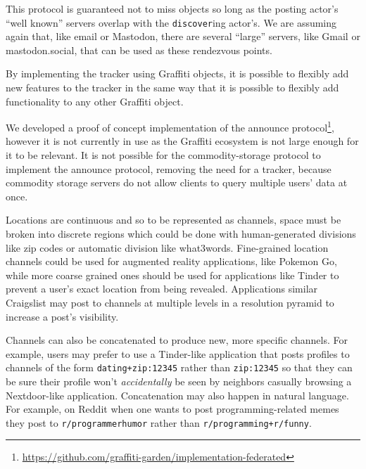 This protocol is guaranteed not to miss objects so long as
the posting actor's ``well known'' servers overlap with the
\texttt{discover}ing actor's.
We are assuming again that, like email or Mastodon, there are several
``large'' servers, like Gmail or mastodon.social, that can be used as these
rendezvous points.

By implementing the tracker using Graffiti objects,
it is possible to flexibly add new features to the tracker
in the same way that it is possible to flexibly add
functionality to any other Graffiti object.

We developed a proof of concept implementation of the announce protocol\footnote{
    \url{https://github.com/graffiti-garden/implementation-federated}
},
however it is not currently in use as the Graffiti ecosystem is not
large enough for it to be relevant.
It is not possible for the commodity-storage protocol to implement
the announce protocol, removing the need for a tracker,
because commodity storage servers do not allow clients to
query multiple users' data at once.


Locations are continuous and so to be represented as channels,
space must be broken into discrete regions which could be done with
human-generated divisions like zip codes or automatic division like
what3words. Fine-grained location channels could be used for
augmented reality applications, like Pokemon Go,
while more coarse grained ones should be used for applications like Tinder
to prevent a user's exact location from being revealed.
Applications similar Craigslist may post to channels at multiple levels in
a resolution pyramid to increase a post's visibility.

Channels can also be concatenated to produce new, more specific channels.
For example, users may prefer to use a Tinder-like application that posts
profiles to channels of the form \texttt{dating+zip:12345} rather than
\texttt{zip:12345} so that they can be sure their profile won't
\emph{accidentally} be seen by neighbors casually browsing a Nextdoor-like application.
Concatenation may also happen in natural language.
For example, on Reddit when one wants to post programming-related memes they post to \texttt{r/programmerhumor} rather than \texttt{r/programming+\allowbreak{}r/funny}.
